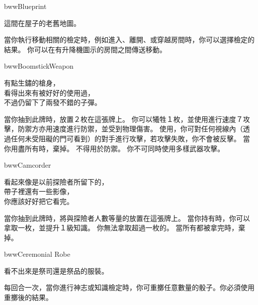 %
\begin{ItemCard}{bww}{Blueprint}{}
  \begin{CardStory}
    這間在屋子的老舊地圖。
  \end{CardStory}
  當你執行移動相關的檢定時，例如進入、離開、或穿越房間時，你可以選擇檢定的結果。\smallbreak
  你可以在有升降機圖示的房間之間傳送移動。\smallbreak
\end{ItemCard}%
\linebreak[0]%
\begin{ItemCard}{bww}{Boomstick}{Weapon}
  \begin{CardStory}
    有點生鏽的槍身，\\
    看得出來有被好好的使用過，\\
    不過仍留下了兩發不錯的子彈。
  \end{CardStory}
  當你抽到此牌時，放置２枚在這張牌上。\smallbreak
  你可以犧牲１枚，並使用\ThisName{}進行速度７攻擊，防禦方亦用速度進行防禦，並受到物理傷害。\smallbreak
  使用\ThisName{}，你可對任何視線內（透過任何未受阻礙的門可看到）的對手進行攻擊，若攻擊失敗，你不會被反擊。\smallbreak
  當你用盡所有時，棄掉\ThisName{}。\smallbreak
  \ThisName{}不得用於防禦。\smallbreak
  你不可同時使用多樣武器攻擊。\smallbreak
\end{ItemCard}%
\linebreak[0]%
\begin{ItemCard}{bww}{Camcorder}{}
  \begin{CardStory}
    看起來像是以前探險者所留下的，\\
    帶子裡還有一些影像，\\
    你應該好好把它看完。
  \end{CardStory}
  當你抽到此牌時，將與探險者人數等量的放置在這張牌上。\smallbreak
  當你持有\ThisName{}時，你可以拿取一枚，並提升１級知識。\smallbreak
  你無法拿取超過一枚的。\smallbreak
  當所有都被拿完時，棄掉\ThisName{}。\smallbreak
\end{ItemCard}%
\linebreak[0]%
\begin{ItemCard}{bww}{Ceremonial Robe}{}
  \begin{CardStory}
    看不出來是祭司還是祭品的服裝。
  \end{CardStory}
  每回合一次，當你進行神志或知識檢定時，你可重擲任意數量的骰子。你必須使用重擲後的結果。\smallbreak
\end{ItemCard}%
